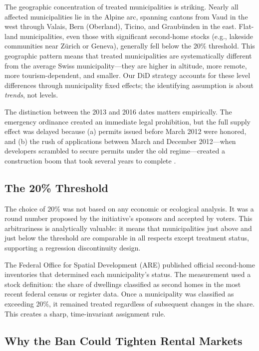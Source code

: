 \documentclass[12pt]{article}
\begin{document}
The geographic concentration of treated municipalities is striking. Nearly all affected municipalities lie in the Alpine arc, spanning cantons from Vaud in the west through Valais, Bern (Oberland), Ticino, and Graub\"{u}nden in the east. Flat-land municipalities, even those with significant second-home stocks (e.g., lakeside communities near Z\"{u}rich or Geneva), generally fell below the 20\% threshold. This geographic pattern means that treated municipalities are systematically different from the average Swiss municipality---they are higher in altitude, more remote, more tourism-dependent, and smaller. Our DiD strategy accounts for these level differences through municipality fixed effects; the identifying assumption is about \textit{trends}, not levels.

The distinction between the 2013 and 2016 dates matters empirically. The emergency ordinance created an immediate legal prohibition, but the full supply effect was delayed because (a) permits issued before March 2012 were honored, and (b) the rush of applications between March and December 2012---when developers scrambled to secure permits under the old regime---created a construction boom that took several years to complete \citep{deville2022restricting}.

\subsection{The 20\% Threshold}

The choice of 20\% was not based on any economic or ecological analysis. It was a round number proposed by the initiative's sponsors and accepted by voters. This arbitrariness is analytically valuable: it means that municipalities just above and just below the threshold are comparable in all respects except treatment status, supporting a regression discontinuity design.

The Federal Office for Spatial Development (ARE) published official second-home inventories that determined each municipality's status. The measurement used a stock definition: the share of dwellings classified as second homes in the most recent federal census or register data. Once a municipality was classified as exceeding 20\%, it remained treated regardless of subsequent changes in the share. This creates a sharp, time-invariant assignment rule.

\subsection{Why the Ban Could Tighten Rental Markets}
\end{document}
